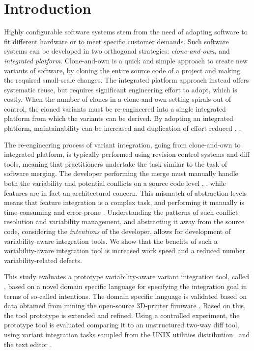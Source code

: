 \chapter{Introduction}
Highly configurable software systems stem from the need of adapting software to fit different hardware or to meet specific customer demands. Such software systems can be developed in two orthogonal strategies: \textit{clone-and-own}, and \textit{integrated platform}. Clone-and-own is a quick and simple approach to create new variants of software, by cloning the entire source code of a project and making the required small-scale changes. The integrated platform approach instead offers systematic reuse, but requires significant engineering effort to adopt, which is costly. When the number of clones in a clone-and-own setting spirals out of control, the cloned variants must be re-engineered into a single integrated platform from which the variants can be derived. By adopting an integrated platform, maintainability can be increased and duplication of effort reduced \cite{schmorleiz2016similarity}, \cite{stanciulescu2015}.

The re-engineering process of variant integration, going from clone-and-own to integrated platform, is typically performed using revision control systems and diff tools, meaning that practitioners undertake the task similar to the task of software merging. The developer performing the merge must manually handle both the variability and potential conflicts on a source code level \cite{mens2002}, \cite{apel2011}, while features are in fact an architectural concern. This mismatch of abstraction levels means that feature integration is a complex task, and performing it manually is time-consuming and error-prone \cite{melo2016latin}. Understanding the patterns of such conflict resolution and variability management, and abstracting it away from the source code, considering the \textit{intentions} of the developer, allows for development of variability-aware integration tools. We show that the benefits of such a variability-aware integration tool is increased work speed and a reduced number variability-related defects.

This study evaluates a prototype variability-aware variant integration tool, called \tooln, based on a novel domain specific language for specifying the integration goal in terms of so-called intentions.
The domain specific language is validated based on data obtained from mining the open-source 3D-printer firmware \marlin. Based on this, the tool prototype is extended and refined. Using a controlled experiment, the prototype tool is evaluated comparing it to an unstructured two-way diff tool, using variant integration tasks sampled from the UNIX utilities distribution \busybox~and the text editor \vim.

